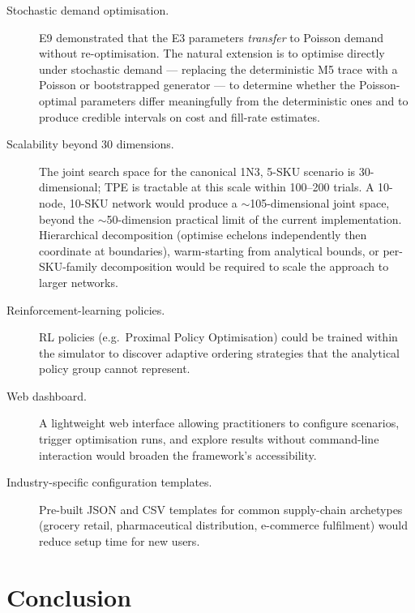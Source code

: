 \begin{description}
  \item[Stochastic demand optimisation.] E9 demonstrated that the E3
        parameters \emph{transfer} to Poisson demand without
        re-optimisation.  The natural extension is to optimise
        directly under stochastic demand — replacing the deterministic
        M5 trace with a Poisson or bootstrapped generator — to
        determine whether the Poisson-optimal parameters differ
        meaningfully from the deterministic ones and to produce
        credible intervals on cost and fill-rate estimates.

  \item[Scalability beyond 30 dimensions.] The joint search space for
        the canonical 1N3, 5-SKU scenario is 30-dimensional; TPE is
        tractable at this scale within 100--200 trials.  A 10-node,
        10-SKU network would produce a $\sim$105-dimensional joint
        space, beyond the $\sim$50-dimension practical limit of the
        current implementation.  Hierarchical decomposition
        (optimise echelons independently then coordinate at
        boundaries), warm-starting from analytical bounds, or
        per-SKU-family decomposition would be required to scale the
        approach to larger networks.

  \item[Reinforcement-learning policies.] RL policies (e.g.\ Proximal
        Policy Optimisation) could be trained within the simulator to
        discover adaptive ordering strategies that the analytical
        policy group cannot represent.

  \item[Web dashboard.] A lightweight web interface allowing
        practitioners to configure scenarios, trigger optimisation
        runs, and explore results without command-line interaction
        would broaden the framework's accessibility.

  \item[Industry-specific configuration templates.] Pre-built JSON
        and CSV templates for common supply-chain archetypes (grocery
        retail, pharmaceutical distribution, e-commerce fulfilment)
        would reduce setup time for new users.
\end{description}

\section{Conclusion}
\label{sec:conc:closing}

